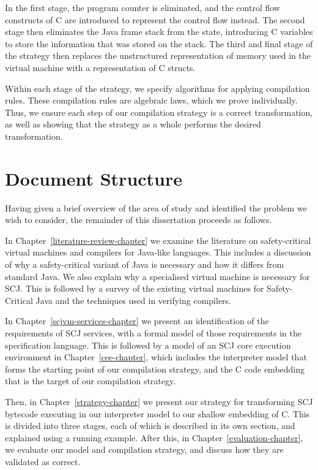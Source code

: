 In the first stage, the program counter is eliminated, and the control
flow constructs of C are introduced to represent the control flow
instead.
The second stage then eliminates the Java frame stack from the state,
introducing C variables to store the information that was stored on
the stack.
The third and final stage of the strategy then replaces the
unstructured representation of memory used in the virtual machine with
a representation of C structs.

Within each stage of the strategy, we specify algorithms for applying
compilation rules.
These compilation rules are algebraic laws, which we prove
individually.
Thus, we ensure each step of our compilation strategy is a correct
transformation, as well as showing that the strategy as a whole
performs the desired transformation.

\section{Document Structure}
\label{document-structure-section}

Having given a brief overview of the area of study and identified the
problem we wish to consider, the remainder of this dissertation
proceeds as follows.

In Chapter~\ref{literature-review-chapter} we examine the literature
on safety-critical virtual machines and compilers for Java-like
languages.
This includes a discussion of why a safety-critical variant of Java is
necessary and how it differs from standard Java.
We also explain why a specialised virtual machine is necessary for
SCJ.
This is followed by a survey of the existing virtual machines for
Safety-Critical Java and the techniques used in verifying compilers.

In Chapter~\ref{scjvm-services-chapter} we present an identification
of the requirements of SCJ
services, with a formal model of those requirements in the \Circus{}
specification language.
This is followed by a model of an SCJ core execution environment in
Chapter~\ref{cee-chapter}, which includes the interpreter model that
forms the starting point of our compilation strategy, and the C code
embedding that is the target of our compilation strategy.

Then, in Chapter~\ref{strategy-chapter}\added{,} we present our
strategy for transforming SCJ bytecode executing in our interpreter
model to our shallow embedding of C.
This is divided into three stages, each of which is described in its
own section, and explained using a running example.
After this, in Chapter~\ref{evaluation-chapter}, we evaluate our model
and compilation strategy, and discuss how they are validated as
correct.

